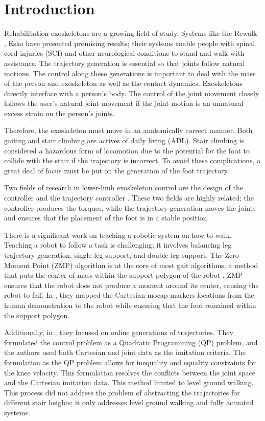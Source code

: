 \section{Introduction} 

Rehabilitation exoskeletons are a growing field of study. Systems like the Rewalk \cite{esquenazi2012rewalk}, Esko \cite{mertz2012next} have presented promising results; their systems enable people with spinal cord injuries (SCI) and other neurological conditions to stand and walk with assistance. The trajectory generation is essential so that joints follow natural motions. The control along these generations is important to deal with the mass of the person and exoskeleton as well as the contact dynamics. Exoskeletons directly interface with a person's body. The control of the joint movement closely follows the user's natural joint movement if the joint motion is an unnatural excess strain on the person's joints. 

Therefore, the exoskeleton must move in an anatomically correct manner. Both gaiting and stair climbing are actives of daily living (ADL). Stair climbing is considered a hazardous form of locomotion \cite{HicksLittle2011LowerEJ}  due to the potential for the foot to collide with the stair if the trajectory is incorrect. To avoid these complications, a great deal of focus must be put on the generation of the foot trajectory.  

Two fields of research in lower-limb exoskeleton control are the design of the controller and the trajectory controller \cite{huang2016optimisation}. These two fields are highly related; the controller produces the torques, while the trajectory generation moves the joints and ensures that the placement of the foot is in a stable position.  

There is a significant work on teaching a robotic system on how to walk. Teaching a robot to follow a task is challenging; it involves balancing leg trajectory generation, single-leg support, and double leg support. The Zero Moment Point (ZMP) algorithm is at the core of most gait algorithms, a method that puts the center of mass within the support polygon of the robot \cite{kajita2003biped}. ZMP ensures that the robot does not produce a moment around its center, causing the robot to fall. In \cite{GaitSynthesis}, they mapped the Cartesian mocap markers locations from the human demonstration to the robot while ensuring that the foot remained within the support polygon.   

Additionally, in \cite{taskjointmocap}, they focused on online generations of trajectories. They formulated the control problem as a Quadratic Programming (QP) problem, and the authors used both Cartesian and joint data as the imitation criteria. The formulation as the QP problem allows for inequality and equality constraints for the knee velocity. This formulation resolves the conflicts between the joint space and the Cartesian imitation data. This method limited to level ground walking. This process did not address the problem of abstracting the trajectories for different stair heights; it only addresses level ground walking and fully actuated systems.    

